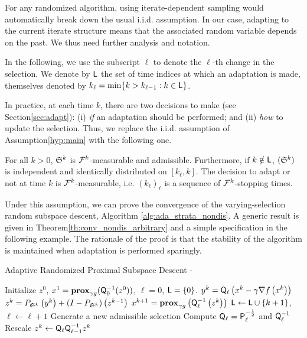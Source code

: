 {For any randomized algorithm,  
using iterate-dependent sampling would automatically break down the usual i.i.d. assumption.} %
In our case, adapting to the current iterate structure means that the associated random variable depends on the past. We thus need further analysis and notation.

In the following, we use the subscript $\ell$ to denote the $\ell$-th change in the selection. We denote by $\mathsf{L}$ the set of time indices at which an adaptation is made, themselves denoted by $k_\ell  = \min \{ k> k_{\ell-1} : k\in\mathsf{L}\}$. 

In practice, at each time $k$, there are two decisions to make (see Section\;\ref{sec:adapt}): (i) \emph{if} an adaptation should be performed; and (ii) \emph{how} to update the selection. Thus, we replace the i.i.d. assumption of Assumption\;\ref{hyp:main} with the following one.

\begin{assumption}\label{hyp:main_identif}
For all $k>0$, $\mathfrak{S}^k$ is $\mathcal{F}^k$-measurable and admissible. Furthermore, if $k\notin\mathsf{L}$,  $(\mathfrak{S}^k)$ is independent and identically distributed on $[{k}_{\ell},k]$. The decision to adapt or not at time $k$ is $\mathcal{F}^k$-measurable, i.e. $(k_\ell)_\ell$ is a sequence of $\mathcal{F}^k$-stopping times. 
\end{assumption}

Under this assumption, we can prove the convergence of the varying-selection random subspace descent, Algorithm \ref{alg:ada_strata_nondis}. A generic result is given in Theorem\;\ref{th:conv_nondis_arbitrary} and a simple specification in the following example. The rationale of the proof is that the stability of the algorithm is maintained when adaptation is performed sparingly. 


\begin{algorithm}[H] %
\caption{Adaptive Randomized Proximal Subspace Descent - \adaalgo}
\label{alg:ada_strata_nondis}
\begin{algorithmic}[1] %
    \STATE Initialize $z^0$, $x^1 = \mathbf{prox}_{\gamma g}({\mathsf{Q}}_0^{-1}(z^0))$, $\ell=0$, $\mathsf{L}=\{0\}$.
            \STATE $y^k = {\mathsf{Q}}_{\ell}\left(x^k - \gamma\nabla f\left(x^k\right)\right)$
            \STATE $z^{k} = P_{\mathfrak{S}^k} \left(y^k\right) + (I- P_{\mathfrak{S}^k} ) \left(z^{k-1}\right)$
            \STATE$x^{k+1} = \mathbf{prox}_{\gamma g} \left({\mathsf{Q}}_\ell^{-1}\left(z^{k}\right)\right)$
            \STATE $\mathsf{L} \leftarrow \mathsf{L} \cup \{k+1\}$, $\ell\leftarrow \ell +1$
            \STATE Generate a new admissible selection
            \STATE Compute ${\mathsf{Q}}_\ell = {\mathsf{P}}_\ell^{-\frac12}$ and ${\mathsf{Q}}_\ell^{-1}$
            \STATE Rescale $z^k \leftarrow {\mathsf{Q}}_\ell   {\mathsf{Q}}_{\ell-1}^{-1} z^k$ \label{line:rescale}
            \ENDIF
    \ENDFOR
\end{algorithmic}
\end{algorithm}



